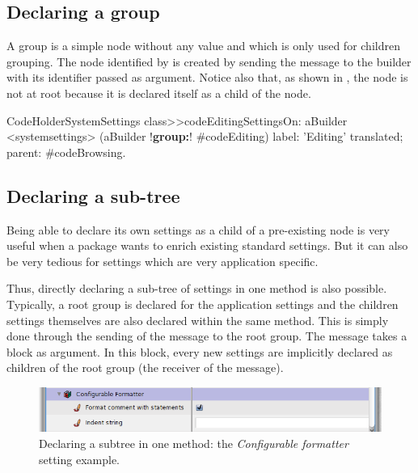 \documentclass[a4paper,10pt,twoside]{book}
\begin{document}
\subsection{Declaring a group}
A group is a simple node without any value and which is only used for children grouping.
The node identified by  is created by sending the  message to the builder with its identifier passed as argument.  Notice also that, as shown in , the  node is not at root because it is declared itself as a child of the  node.


\begin{code}{}
CodeHolderSystemSettings class>>codeEditingSettingsOn: aBuilder
	<systemsettings>
	(aBuilder !\textbf{group:}! #codeEditing) 
		label: 'Editing' translated;
		parent: #codeBrowsing.
\end{code}


\subsection{Declaring a sub-tree}
Being able to declare its own settings as a child of a pre-existing node is very useful when a package wants to enrich existing standard settings. But it can also be very tedious for settings which are very application specific. 

Thus, directly declaring a sub-tree of settings in one method is also possible. Typically, a root group is declared for the application settings and the children settings themselves are also declared within the same method. This is simply done through the sending of the  message to the root group. The  message takes a block as argument. In this block, every new settings are implicitly declared as children of the root group (the receiver of the  message). 

\begin{figure}[tbh]
\begin{center}
\includegraphics[scale=0.47]{configurableFormatter}
\caption{Declaring a subtree in one method: the \textit{Configurable formatter} setting example.}
\end{center}
\end{figure}
\end{document}
